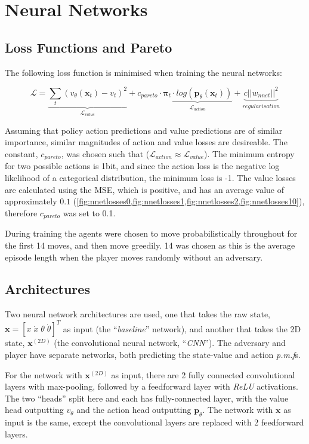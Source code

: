 \documentclass[../main.tex]{subfiles}
\begin{document}
\section{Neural Networks}
\subsection{Loss Functions and Pareto}

The following loss function is minimised when training the neural networks:

\begin{equation}
   \mathcal{L} = \underbrace{\sum_t (v_\theta (\boldsymbol{x}_t) - v_t)^2}_{\mathcal{L}_{value}} + c_{pareto} \cdot \underbrace{\boldsymbol{\pi}_t \cdot log(\boldsymbol{p}_\theta(\boldsymbol{x}_t))}_{\mathcal{L}_{action}}  + \underbrace{c||w_{nnet}||^2}_{regularisation}
\end{equation}

Assuming that policy action predictions and value predictions are of similar importance, similar magnitudes of action and value losses are desireable. The constant, $c_{pareto}$, was chosen such that ($\mathcal{L}_{action} \approx \mathcal{L}_{value}$). The minimum entropy for two possible actions is 1bit, and since the action loss is the negative log likelihood of a categorical distribution, the minimum loss is -1. The value losses are calculated using the MSE, which is positive, and has an average value of approximately $0.1$ (\cref{fig:nnetlosses0,fig:nnetlosses1,fig:nnetlosses2,fig:nnetlosses10}), therefore $c_{pareto}$ was set to 0.1.

During training the agents were chosen to move probabilistically throughout for the first 14 moves, and then move greedily. 14 was chosen as this is the average episode length when the player moves randomly without an adversary.

\subsection{Architectures}
\label{sec:architectures}
Two neural network architectures are used, one that takes the raw state, $\boldsymbol{x} = [x \; \dot{x} \; \theta \; \dot{\theta}]^T$ as input (the ``\textit{baseline}'' network), and another that takes the 2D state, $\boldsymbol{x}^{(2D)}$ (the convolutional neural network, ``\textit{CNN}''). The adversary and player have separate networks, both predicting the state-value and action \textit{p.m.f}s.

For the network with $\boldsymbol{x}^{(2D)}$ as input, there are 2 fully connected convolutional layers with max-pooling, followed by a feedforward layer with \textit{ReLU} activations. The two ``heads'' split here and each has fully-connected layer, with the value head outputting $v_\theta$ and the action head outputting $\boldsymbol{p}_\theta$. The network with $\boldsymbol{x}$ as input is the same, except the convolutional layers are replaced with 2 feedforward layers.
\end{document}
